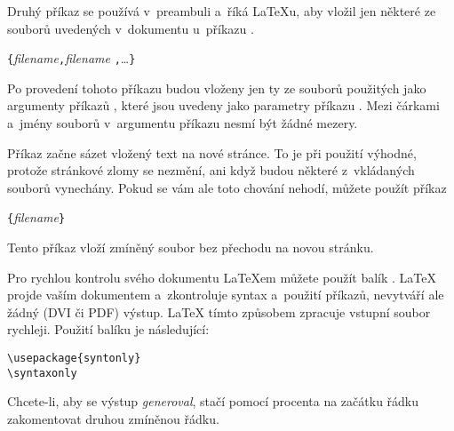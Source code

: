 Druhý příkaz se používá v~preambuli a~říká \LaTeX u, aby vložil
jen některé ze souborů uvedených v~dokumentu u~příkazu \verb||.
\begin{lscommand}
\verb|{|\emph{filename}\verb|,|\emph{filename}%
\verb|,|\ldots\verb|}|
\end{lscommand}
Po provedení tohoto příkazu budou vloženy jen ty ze souborů použitých
jako argumenty příkazů , které jsou uvedeny jako parametry příkazu
\verb||. Mezi čárkami a~jmény souborů v~argumentu příkazu
nesmí být žádné mezery.

Příkaz  začne sázet vložený text na nové stránce. To je při
použití  výhodné, protože stránkové zlomy se nezmění, ani
když budou některé z~vkládaných souborů vynechány. Pokud se vám ale toto
chování nehodí, můžete použít příkaz
\begin{lscommand}
\verb|{|\emph{filename}\verb|}|
\end{lscommand}
\noindent Tento příkaz vloží zmíněný soubor bez přechodu na novou stránku.

Pro rychlou kontrolu svého dokumentu \LaTeX em můžete použít balík
. \LaTeX{} projde vaším dokumentem a~zkontroluje syntax
a~použití příkazů, nevytváří ale žádný (DVI či PDF) výstup. \LaTeX{} tímto
způsobem zpracuje vstupní soubor rychleji. Použití balíku je následující:

\begin{verbatim}
\usepackage{syntonly}
\syntaxonly
\end{verbatim}
Chcete-li, aby se výstup \emph{generoval}, stačí pomocí procenta na začátku řádku zakomentovat 
druhou zmíněnou řádku.


%

